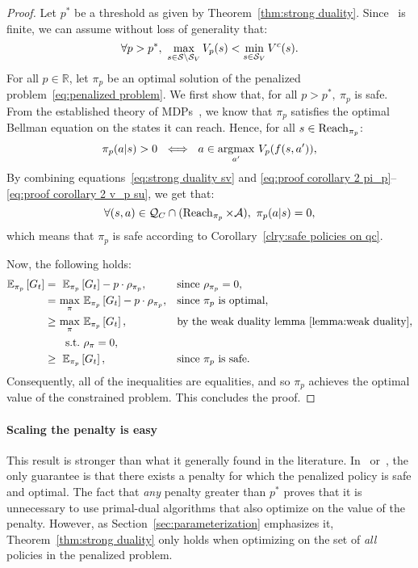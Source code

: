 \begin{proof}
	Let $p^*$ be a threshold as given by Theorem~\ref{thm:strong duality}. Since \Q~is finite, we can assume without loss of generality that:
	 \begin{equation}
	 \forall p > p^*,~\max_{s\in\mathcal{S}\setminus{\ensuremath{\mathcal{S}}_{V}}}V_p(s) < \min_{s\in{\ensuremath{\mathcal{S}}_{V}}}V^c(s). \label{eq:proof corollary 2 v_p su}
	 \end{equation}
	 For all $p\in\mathbb{R}$, let $\pi_p$ be an optimal solution of the penalized problem~\eqref{eq:penalized problem}.  We first show that, for all $p>p^*,~\pi_p$ is safe. From the established theory of MDPs~\cite{sutton2018reinforcement}, we know that $\pi_p$ satisfies the optimal Bellman equation on the states it can reach. Hence, for all $s\in\operatorname{Reach}_{\pi_p}$:
	\begin{equation}
		\pi_p(a|s) > 0~\iff~a \in \operatorname*{argmax}_{a'}\,V_p(f(s, a')),\label{eq:proof corollary 2 pi_p}
	\end{equation}
	By combining equations~\eqref{eq:strong duality sv} and \eqref{eq:proof corollary 2 pi_p}--\eqref{eq:proof corollary 2 v_p su}, we get that:
	$$
		\forall (s, a) \in \mathcal{Q}_{C}\cap(\operatorname{Reach}_{\pi_p}\times\mathcal{A}),~\pi_p(a|s) = 0,
	$$
	which means that $\pi_p$ is safe according to Corollary~\eqref{clry:safe policies on qc}.\par
	Now, the following holds:
	\begin{equation}
	\begin{alignedat}{5}
		\mathbb{E}_{\pi_p}\left[G_t\right] & =~&\mathbb{E}_{\pi_p}&\left[G_t\right] - p\cdot\rho_{\pi_p}, & &\quad\text{since}~\rho_{\pi_p} = 0,\\
		& =~&\max_\pi&~\mathbb{E}_{\pi_p}\left[G_t\right] - p\cdot\rho_{\pi_p},& &\quad\text{since}~\pi_p~\text{is optimal},\\
		& \geq~& \max_\pi&~\mathbb{E}_{\pi_p}\left[G_t\right],& &\quad\text{by the weak duality lemma~\ref{lemma:weak duality}},\\
		&		& \text{s.t.}&~\rho_\pi = 0,& &\\
		& \geq~& \mathbb{E}_{\pi_p}&\left[G_t\right], & &\quad\text{since}~\pi_p~\text{is safe}.
		\end{alignedat}\label{eq:proof corollary 2 duality}
	\end{equation}
	Consequently, all of the inequalities are equalities, and so $\pi_p$ achieves the optimal value of the constrained problem. This concludes the proof.
\end{proof}

\paragraph{Scaling the penalty is easy} This result is stronger than what it generally found in the literature. In~\cite{altman1999constrained} or~\cite{paternain2019safe}, the only guarantee is that there exists a penalty for which the penalized policy is safe and optimal. The fact that\emph{ any} penalty greater than $p^*$ proves that it is unnecessary to use primal-dual algorithms that also optimize on the value of the penalty. However, as Section~\ref{sec:parameterization} emphasizes it, Theorem~\ref{thm:strong duality} only holds when optimizing on the set of\emph{ all} policies in the penalized problem.

